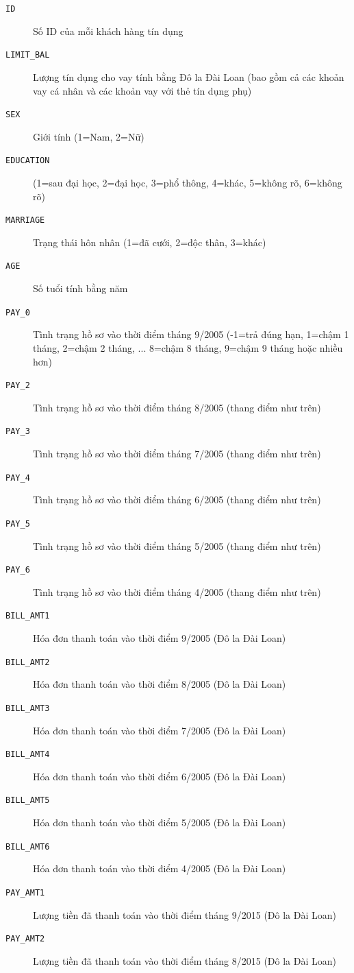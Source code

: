 \documentclass[a4paper]{report}\usepackage[]{graphicx}\usepackage[]{color}
\begin{document}
\begin{description}
  \item [\texttt{ID}] Số ID của mỗi khách hàng tín dụng
  \item [\texttt{LIMIT\_BAL}] Lượng tín dụng cho vay tính bằng Đô la Đài Loan (bao gồm cả các khoản vay cá nhân và các khoản vay với thẻ tín dụng phụ)
  \item [\texttt{SEX}] Giới tính (1=Nam, 2=Nữ)
  \item [\texttt{EDUCATION}] (1=sau đại học, 2=đại học, 3=phổ thông, 4=khác, 5=không rõ, 6=không rõ)
  \item [\texttt{MARRIAGE}] Trạng thái hôn nhân (1=đã cưới, 2=độc thân, 3=khác)
  \item [\texttt{AGE}] Số tuổi tính bằng năm
  \item [\texttt{PAY\_0}] Tình trạng hồ sơ vào thời điểm tháng 9/2005 (-1=trả đúng hạn, 1=chậm 1 tháng, 2=chậm 2 tháng, ... 8=chậm 8 tháng, 9=chậm 9 tháng hoặc nhiều hơn)
  \item [\texttt{PAY\_2}] Tình trạng hồ sơ vào thời điểm tháng 8/2005 (thang điểm như trên)
  \item [\texttt{PAY\_3}] Tình trạng hồ sơ vào thời điểm tháng 7/2005 (thang điểm như trên)
  \item [\texttt{PAY\_4}] Tình trạng hồ sơ vào thời điểm tháng 6/2005 (thang điểm như trên)
  \item [\texttt{PAY\_5}] Tình trạng hồ sơ vào thời điểm tháng 5/2005 (thang điểm như trên)
  \item [\texttt{PAY\_6}] Tình trạng hồ sơ vào thời điểm tháng 4/2005 (thang điểm như trên)
  \item [\texttt{BILL\_AMT1}] Hóa đơn thanh toán vào thời điểm 9/2005 (Đô la Đài Loan)
  \item [\texttt{BILL\_AMT2}] Hóa đơn thanh toán vào thời điểm 8/2005 (Đô la Đài Loan)
  \item [\texttt{BILL\_AMT3}] Hóa đơn thanh toán vào thời điểm 7/2005 (Đô la Đài Loan)
  \item [\texttt{BILL\_AMT4}] Hóa đơn thanh toán vào thời điểm 6/2005 (Đô la Đài Loan)
  \item [\texttt{BILL\_AMT5}] Hóa đơn thanh toán vào thời điểm 5/2005 (Đô la Đài Loan)
  \item [\texttt{BILL\_AMT6}] Hóa đơn thanh toán vào thời điểm 4/2005 (Đô la Đài Loan)
  \item [\texttt{PAY\_AMT1}] Lượng tiền đã thanh toán vào thời điểm tháng 9/2015 (Đô la Đài Loan)
  \item [\texttt{PAY\_AMT2}] Lượng tiền đã thanh toán vào thời điểm tháng 8/2015 (Đô la Đài Loan)

\end{description}
\end{document}
